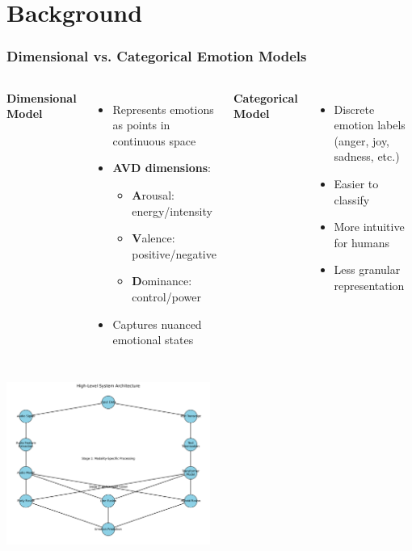 \documentclass{beamer}
\begin{document}
\section{Background}

\begin{frame}
\frametitle{Dimensional vs. Categorical Emotion Models}
\begin{columns}
\textbf{Dimensional Model}
\begin{itemize}
    \item Represents emotions as points in continuous space
    \item \textbf{AVD dimensions}:
    \begin{itemize}
        \item \textbf{A}rousal: energy/intensity
        \item \textbf{V}alence: positive/negative
        \item \textbf{D}ominance: control/power
    \end{itemize}
    \item Captures nuanced emotional states
\end{itemize}

\textbf{Categorical Model}
\begin{itemize}
    \item Discrete emotion labels (anger, joy, sadness, etc.)
    \item Easier to classify
    \item More intuitive for humans
    \item Less granular representation
\end{itemize}
\end{columns}

\begin{center}
\includegraphics[width=0.5\textwidth]{figures/system_architecture.png}
\end{center}
\end{frame}
\end{document}
